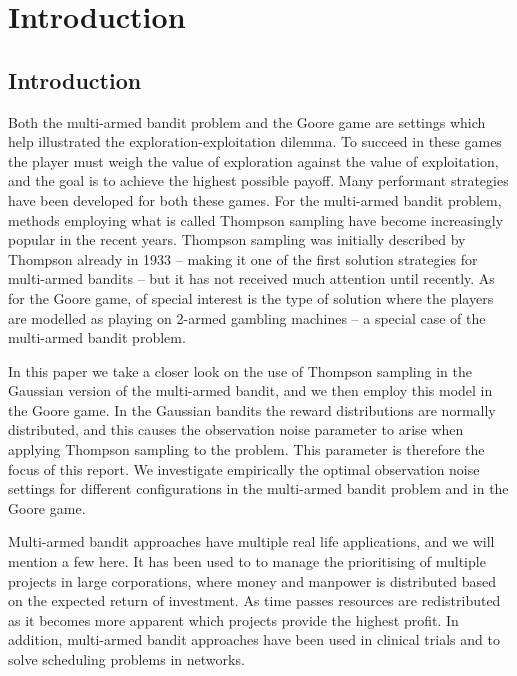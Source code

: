 \chapter{Introduction}
\label{ch:introduction}

\section{Introduction}
Both the multi-armed bandit problem and the Goore game are settings which help illustrated the exploration-exploitation dilemma.
To succeed in these games the player must weigh the value of exploration against the value of exploitation, and the goal is to achieve the highest possible payoff.
Many performant strategies have been developed for both these games.
For the multi-armed bandit problem, methods employing what is called Thompson sampling have become increasingly popular in the recent years.
Thompson sampling was initially described by Thompson already in 1933 -- making it one of the first solution strategies for multi-armed bandits -- but it has not received much attention until recently.
As for the Goore game, of special interest is the type of solution where the players are modelled as playing on 2-armed gambling machines -- a special case of the multi-armed bandit problem.

In this paper we take a closer look on the use of Thompson sampling in the Gaussian version of the multi-armed bandit, and we then employ this model in the Goore game.
In the Gaussian bandits the reward distributions are normally distributed, and this causes the observation noise parameter \ob{} to arise when applying Thompson sampling to the problem.
This parameter is therefore the focus of this report.
We investigate empirically the optimal observation noise settings for different configurations in the multi-armed bandit problem and in the Goore game.

Multi-armed bandit approaches have multiple real life applications, and we will mention a few here.
It has been used to to manage the prioritising of multiple projects in large corporations, where money and manpower is distributed based on the expected return of investment.
As time passes resources are redistributed as it becomes more apparent which projects provide the highest profit.
In addition, multi-armed bandit approaches have been used in clinical trials and to solve scheduling problems in networks.

